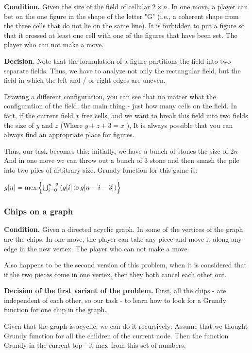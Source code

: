 \textbf{Condition.} Given the size of the field of cellular $2 \times n$. In one move, a player can bet on the one figure in the shape of the letter "G" (i.e., a coherent shape from the three cells that do not lie on the same line). It is forbidden to put a figure so that it crossed at least one cell with one of the figures that have been set. The player who can not make a move.

\textbf{Decision.} Note that the formulation of a figure partitions the field into two separate fields. Thus, we have to analyze not only the rectangular field, but the field in which the left and / or right edges are uneven.

Drawing a different configuration, you can see that no matter what the configuration of the field, the main thing - just how many cells on the field. In fact, if the current field $x$ free cells, and we want to break this field into two fields the size of $y$ and $z$ (Where $y + z +3 = x$ ), It is always possible that you can always find an appropriate place for figures.

Thus, our task becomes this: initially, we have a bunch of stones the size of $2n$ And in one move we can throw out a bunch of $3$ stone and then smash the pile into two piles of arbitrary size. Grundy function for this game is:

$g[n]={\rm mex}\left\{ \bigcup_{i=0}^{n-3}\left(g[i]\oplus g[n-i-3]\right)\right\} $

\subsubsection{ Chips on a graph }

\textbf{Condition.} Given a directed acyclic graph. In some of the vertices of the graph are the chips. In one move, the player can take any piece and move it along any edge in the new vertex. The player who can not make a move.

Also happens to be the second version of this problem, when it is considered that if the two pieces come in one vertex, then they both cancel each other out.

\textbf{Decision of the first variant of the problem.} First, all the chips - are independent of each other, so our task - to learn how to look for a Grundy function for one chip in the graph.

Given that the graph is acyclic, we can do it recursively: Assume that we thought Grundy function for all the children of the current node. Then the function Grundy in the current top - it $\rm mex$ from this set of numbers.

